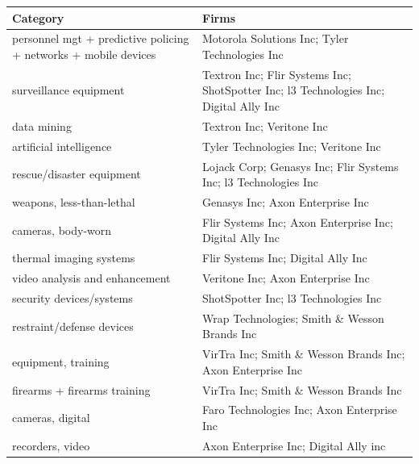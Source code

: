 {\tiny{}}%
\begin{tabular}{ll}
\hline 
{\tiny{}Category} & {\tiny{}Firms}\tabularnewline
\hline 
{\tiny{}personnel mgt + predictive policing + networks + mobile devices} & {\tiny{}Motorola Solutions Inc; Tyler Technologies Inc}\tabularnewline
{\tiny{}surveillance equipment} & {\tiny{}Textron Inc; Flir Systems Inc; ShotSpotter Inc; l3 Technologies
Inc; Digital Ally Inc}\tabularnewline
{\tiny{}data mining} & {\tiny{}Textron Inc; Veritone Inc}\tabularnewline
{\tiny{}artificial intelligence} & {\tiny{}Tyler Technologies Inc; Veritone Inc}\tabularnewline
{\tiny{}rescue/disaster equipment} & {\tiny{}Lojack Corp; Genasys Inc; Flir Systems Inc; l3 Technologies
Inc}\tabularnewline
{\tiny{}weapons, less-than-lethal} & {\tiny{}Genasys Inc; Axon Enterprise Inc}\tabularnewline
{\tiny{}cameras, body-worn} & {\tiny{}Flir Systems Inc; Axon Enterprise Inc; Digital Ally Inc}\tabularnewline
{\tiny{}thermal imaging systems} & {\tiny{}Flir Systems Inc; Digital Ally Inc}\tabularnewline
{\tiny{}video analysis and enhancement} & {\tiny{}Veritone Inc; Axon Enterprise Inc}\tabularnewline
{\tiny{}security devices/systems} & {\tiny{}ShotSpotter Inc; l3 Technologies Inc}\tabularnewline
{\tiny{}restraint/defense devices} & {\tiny{}Wrap Technologies; Smith \& Wesson Brands Inc}\tabularnewline
{\tiny{}equipment, training} & {\tiny{}VirTra Inc; Smith \& Wesson Brands Inc; Axon Enterprise Inc}\tabularnewline
{\tiny{}firearms + firearms training} & {\tiny{}VirTra Inc; Smith \& Wesson Brands Inc}\tabularnewline
{\tiny{}cameras, digital} & {\tiny{}Faro Technologies Inc; Axon Enterprise Inc}\tabularnewline
{\tiny{}recorders, video} & {\tiny{}Axon Enterprise Inc; Digital Ally inc}\tabularnewline
\hline 
\end{tabular}{\tiny\par}

